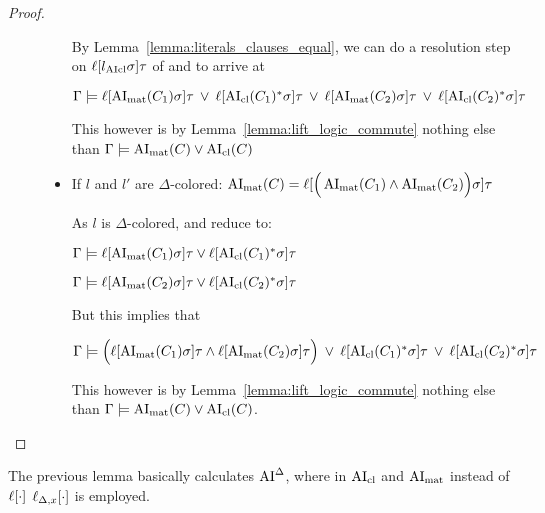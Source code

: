 \documentclass[,%
	paper=a4,%
	DIV10, %
	twoside=false,%
	liststotoc,
	bibtotoc,
	draft=false,%
	numbers=noendperiod
]{scrartcl}
\begin{document}
\begin{proof}
\begin{description}
\begin{itemize}
					By Lemma~\ref{lemma:literals_clauses_equal}, we can do a resolution step on $\ell[l_{\operatorname{AIcl}}\sigma]\tau$ of \markA{} and \markB{} to arrive at 

					$\Gamma \models \ell[\operatorname{AI}_\mathrm{mat}(C_1)\sigma]\tau \;\,{\lor}\;\, \ell[\operatorname{AI}_\mathrm{cl}(C_1)^*\sigma]\tau\;\,{\lor}\;\, 
					\ell[\operatorname{AI}_\mathrm{mat}(C_2)\sigma]\tau\;\,{\lor}\;\, \ell[\operatorname{AI}_\mathrm{cl}(C_2)^*\sigma]\tau $

					This however is by Lemma~\ref{lemma:lift_logic_commute} nothing else than
					$\Gamma \models \operatorname{AI}_\mathrm{mat}(C) \lor \operatorname{AI}_\mathrm{cl}(C)$

				\item If $l$ and $l'$ are $\Delta$-colored:
					$\operatorname{AI}_\mathrm{mat}(C) = \ell[\Big(\operatorname{AI}_\mathrm{mat}(C_1) \land \operatorname{AI}_\mathrm{mat}(C_2)\Big)\sigma] \tau$

					As $l$ is $\Delta$-colored, \markA{} and \markB{} reduce to:

					$\Gamma \models \ell[\operatorname{AI}_\mathrm{mat}(C_1)\sigma]\tau \lor \ell[\operatorname{AI}_\mathrm{cl}(C_1)^*\sigma]\tau$

					$\Gamma \models \ell[\operatorname{AI}_\mathrm{mat}(C_2)\sigma]\tau \lor \ell[\operatorname{AI}_\mathrm{cl}(C_2)^*\sigma]\tau$

					But this implies that 

					$\Gamma \models \Big(\ell[\operatorname{AI}_\mathrm{mat}(C_1)\sigma]\tau \land \ell[\operatorname{AI}_\mathrm{mat}(C_2)\sigma]\tau\Big) 
					\;\,{\lor}\;\, \ell[\operatorname{AI}_\mathrm{cl}(C_1)^*\sigma]\tau
					\;\,{\lor}\;\, \ell[\operatorname{AI}_\mathrm{cl}(C_2)^*\sigma]\tau$

					This however is by Lemma~\ref{lemma:lift_logic_commute} nothing else than 
					$\Gamma \models \operatorname{AI}_\mathrm{mat}(C) \lor \operatorname{AI}_\mathrm{cl}(C)$.
					\qedhere
			\end{itemize}

	\end{description}
\end{proof}

\begin{lemma}
	The previous lemma basically calculates $\operatorname{AI}^\Delta$, where in $\operatorname{AI}_\mathrm{cl}$ and $\operatorname{AI}_\mathrm{mat}$ instead of $\ell[\cdot]$ $\ell_{\Delta,x}[\cdot]$ is employed.
\end{lemma}
\end{document}
